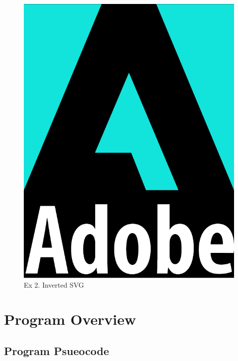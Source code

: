 \documentclass[12pt]{article}
\begin{document}
\begin{figure}[ht]
\begin{minipage}[b]{0.441\textwidth}
		\includegraphics[width=\textwidth]{./pdf/ex3-dark.pdf}
		\caption{Ex 2. Inverted SVG}
	\end{minipage}
\end{figure}

\pagebreak
\restoregeometry

\section{Program Overview}

\subsection{Program Psueocode}
\end{document}
